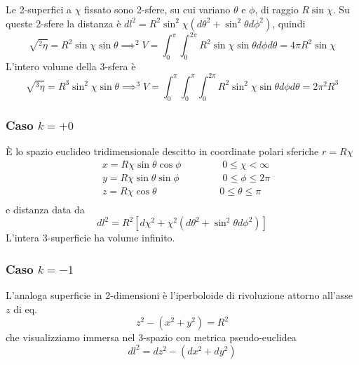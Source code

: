 Le 2-superfici a $\chi$ fissato sono 2-sfere, su cui variano $\theta$ e $\phi$,
di raggio $R \sin \chi$.  Su queste 2-sfere la distanza è $dl^2 = R^2 \sin^2
\chi (d \theta^2+\sin^2 \theta d\phi^2)$, quindi
\begin{equation}
  \sqrt{^2\eta } = R^2 \sin\chi \sin \theta \implies
  ^2V= \int_0^{\pi} \int_0^{2 \pi} R^2 \sin\chi \sin \theta d \phi d \theta =
  4\pi R^2 \sin \chi
\end{equation}
L'intero volume della 3-sfera è
\begin{equation}
  \sqrt{^3\eta } = R^3 \sin^2 \chi \sin \theta \implies
  ^3V = \int_0^{\pi} \int_0^{\pi} \int_0^{2 \pi}  R^2 \sin^2 \chi \sin \theta d
  \phi d \theta =  2 \pi^2 R^3
\end{equation}

\subsubsection{Caso $k=+0$}

È lo spazio euclideo tridimensionale descitto in coordinate polari sferiche $r=R
\chi$
\begin{equation}
  \begin{split}
    & x=R \chi \sin \theta \cos \phi~~~~~~~~~~~~~~~~~~~   0 \le \chi < \infty \\
    & y=R \chi \sin \theta \sin \phi~~~~~~~~~~~~~~~~~~~~0\le \phi  \le 2 \pi \\
    & z=R \chi \cos \theta~~~~~~~~~~~~~~~~~~~~~~~~~~~~~0\le \theta \le \pi \\
  \end{split}
\end{equation}
e distanza data da
\begin{equation}
  dl^2 = R^2 \left[ d \chi^2 + \chi^2 \left( d \theta^2+\sin^2 \theta d\phi^2
    \right) \right]
\end{equation}
L'intera 3-superficie ha volume infinito.

\subsubsection{Caso $k=-1$}

L'analoga superficie in 2-dimensioni è l'iperboloide di rivoluzione attorno
all'asse $z$ di eq.
\begin{equation}
  z^2 - (x^2+y^2) = R^2
\end{equation}
che visualizziamo immersa nel 3-spazio con metrica pseudo-euclidea
\begin{equation}
  dl^2 = dz^2-(dx^2+dy^2)
\end{equation}

